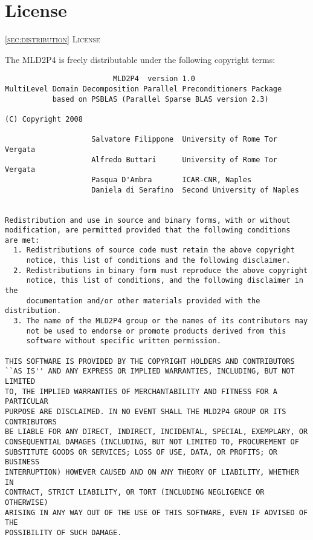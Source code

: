 \section{License\label{sec:distribution}}
         {\textsc{\ref{sec:distribution} License}}

The MLD2P4 is freely distributable under the following copyright
terms: {\small
\begin{verbatim} 
                         MLD2P4  version 1.0
MultiLevel Domain Decomposition Parallel Preconditioners Package
           based on PSBLAS (Parallel Sparse BLAS version 2.3)

(C) Copyright 2008

                    Salvatore Filippone  University of Rome Tor Vergata       
                    Alfredo Buttari      University of Rome Tor Vergata
                    Pasqua D'Ambra       ICAR-CNR, Naples
                    Daniela di Serafino  Second University of Naples


Redistribution and use in source and binary forms, with or without
modification, are permitted provided that the following conditions
are met:
  1. Redistributions of source code must retain the above copyright
     notice, this list of conditions and the following disclaimer.
  2. Redistributions in binary form must reproduce the above copyright
     notice, this list of conditions, and the following disclaimer in the
     documentation and/or other materials provided with the distribution.
  3. The name of the MLD2P4 group or the names of its contributors may
     not be used to endorse or promote products derived from this
     software without specific written permission.

THIS SOFTWARE IS PROVIDED BY THE COPYRIGHT HOLDERS AND CONTRIBUTORS
``AS IS'' AND ANY EXPRESS OR IMPLIED WARRANTIES, INCLUDING, BUT NOT LIMITED
TO, THE IMPLIED WARRANTIES OF MERCHANTABILITY AND FITNESS FOR A PARTICULAR
PURPOSE ARE DISCLAIMED. IN NO EVENT SHALL THE MLD2P4 GROUP OR ITS CONTRIBUTORS
BE LIABLE FOR ANY DIRECT, INDIRECT, INCIDENTAL, SPECIAL, EXEMPLARY, OR
CONSEQUENTIAL DAMAGES (INCLUDING, BUT NOT LIMITED TO, PROCUREMENT OF
SUBSTITUTE GOODS OR SERVICES; LOSS OF USE, DATA, OR PROFITS; OR BUSINESS
INTERRUPTION) HOWEVER CAUSED AND ON ANY THEORY OF LIABILITY, WHETHER IN
CONTRACT, STRICT LIABILITY, OR TORT (INCLUDING NEGLIGENCE OR OTHERWISE)
ARISING IN ANY WAY OUT OF THE USE OF THIS SOFTWARE, EVEN IF ADVISED OF THE
POSSIBILITY OF SUCH DAMAGE.
\end{verbatim}
}